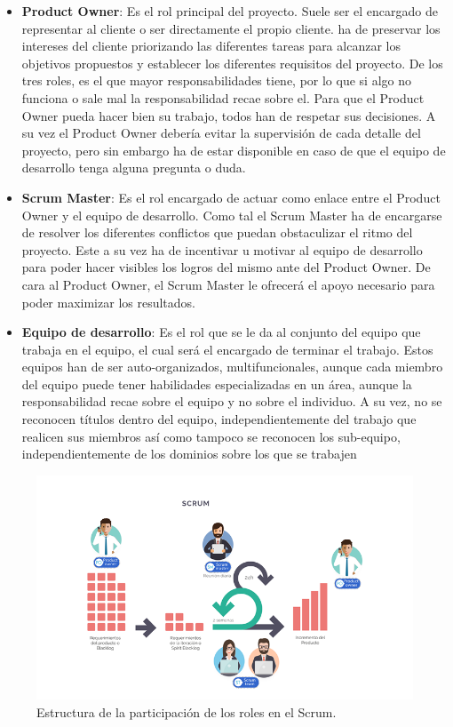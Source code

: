 \begin{itemize}
	\item \textbf{Product Owner}: Es el rol principal del proyecto. Suele ser el encargado de representar al cliente o ser directamente el propio cliente. ha de preservar los intereses del cliente priorizando las diferentes tareas para alcanzar los objetivos propuestos y establecer los diferentes requisitos del proyecto. De los tres roles, es el que mayor responsabilidades tiene, por lo que si algo no funciona o sale mal la responsabilidad recae sobre el. Para que el Product Owner pueda hacer bien su trabajo, todos han de respetar sus decisiones. A su vez el Product Owner debería evitar la supervisión de cada detalle del proyecto, pero sin embargo ha de estar disponible en caso de que el equipo de desarrollo tenga alguna pregunta o duda.
	\item \textbf{Scrum Master}: Es el rol encargado de actuar como enlace entre el Product Owner y el equipo de desarrollo. Como tal el Scrum Master ha de encargarse de resolver los diferentes conflictos que puedan obstaculizar el ritmo del proyecto. Este a su vez ha de incentivar u motivar al equipo de desarrollo para poder hacer visibles los logros del mismo ante del Product Owner. De cara al Product Owner, el Scrum Master le ofrecerá el apoyo necesario para poder maximizar los resultados.
	\item \textbf{Equipo de desarrollo}: Es el rol que se le da al conjunto del equipo que trabaja en el equipo, el cual será el encargado de terminar el trabajo. Estos equipos han de ser auto-organizados, multifuncionales, aunque cada miembro del equipo puede tener habilidades especializadas en un área, aunque la responsabilidad recae sobre el equipo y no sobre el individuo. A su vez, no se reconocen títulos dentro del equipo, independientemente del trabajo que realicen sus miembros así como tampoco se reconocen  los sub-equipo, independientemente de los dominios sobre los que se trabajen
\end{itemize}

\begin{figure}[H]
	\centering
	\includegraphics[width=1\textwidth]{img/roles-scrum}
	\caption{Estructura de la participación de los roles en el Scrum.}
	\label{fig:roles-scrum}
\end{figure}

